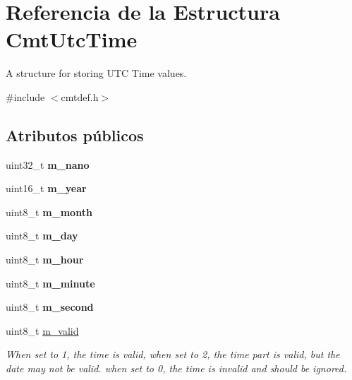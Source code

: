 \hypertarget{structCmtUtcTime}{\section{\-Referencia de la \-Estructura \-Cmt\-Utc\-Time}
\label{structCmtUtcTime}
}


\-A structure for storing \-U\-T\-C \-Time values.  




{\ttfamily \#include $<$cmtdef.\-h$>$}

\subsection*{\-Atributos públicos}
\begin{DoxyCompactItemize}
\item 
\hypertarget{structCmtUtcTime_a346a7e4c0cd57cb128855a354531873c}{uint32\-\_\-t {\bfseries m\-\_\-nano}}\label{structCmtUtcTime_a346a7e4c0cd57cb128855a354531873c}

\item 
\hypertarget{structCmtUtcTime_a1992df26d0b79885456d7817009c9cbd}{uint16\-\_\-t {\bfseries m\-\_\-year}}\label{structCmtUtcTime_a1992df26d0b79885456d7817009c9cbd}

\item 
\hypertarget{structCmtUtcTime_a6350b1c6f6381d2400823ad69b0f919d}{uint8\-\_\-t {\bfseries m\-\_\-month}}\label{structCmtUtcTime_a6350b1c6f6381d2400823ad69b0f919d}

\item 
\hypertarget{structCmtUtcTime_a88ed367451d92fcad5f4282044fa2ae6}{uint8\-\_\-t {\bfseries m\-\_\-day}}\label{structCmtUtcTime_a88ed367451d92fcad5f4282044fa2ae6}

\item 
\hypertarget{structCmtUtcTime_a89b2e3408cdd8179efffc3cf43f7255e}{uint8\-\_\-t {\bfseries m\-\_\-hour}}\label{structCmtUtcTime_a89b2e3408cdd8179efffc3cf43f7255e}

\item 
\hypertarget{structCmtUtcTime_a21582c8b368db5f0b4b6202499c7d740}{uint8\-\_\-t {\bfseries m\-\_\-minute}}\label{structCmtUtcTime_a21582c8b368db5f0b4b6202499c7d740}

\item 
\hypertarget{structCmtUtcTime_ab08f2ea6befb17370e7cdf9b7b1674b9}{uint8\-\_\-t {\bfseries m\-\_\-second}}\label{structCmtUtcTime_ab08f2ea6befb17370e7cdf9b7b1674b9}

\item 
\hypertarget{structCmtUtcTime_a9b090fdad8c091dac0efd8e3378b11c3}{uint8\-\_\-t \hyperlink{structCmtUtcTime_a9b090fdad8c091dac0efd8e3378b11c3}{m\-\_\-valid}}\label{structCmtUtcTime_a9b090fdad8c091dac0efd8e3378b11c3}

\begin{DoxyCompactList}\small\item\em \-When set to 1, the time is valid, when set to 2, the time part is valid, but the date may not be valid. when set to 0, the time is invalid and should be ignored. \end{DoxyCompactList}\end{DoxyCompactItemize}


